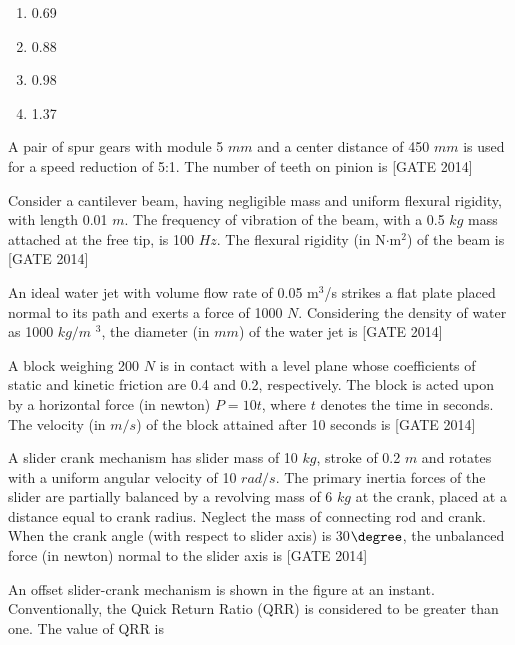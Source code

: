     \begin{multicols}{4}
    \begin{enumerate}
         \item 0.69
        \item 0.88
        \item 0.98
        \item 1.37
    
    \end{enumerate}
       
    \end{multicols}

    \item A pair of spur gears with module 5 $mm$ and a center distance of 450 $mm$ is used for a speed reduction of 5:1. The number of teeth on pinion is \underline{\hspace{2cm}} \hfill{[GATE 2014]}\\

   
    \item Consider a cantilever beam, having negligible mass and uniform flexural rigidity, with length 0.01 $m$. The frequency of vibration of the beam, with a 0.5 $kg$ mass attached at the free tip, is 100 $Hz$. The flexural rigidity (in N$\cdot$m$^2$) of the beam is \underline{\hspace{2cm}} \hfill{[GATE 2014]}\\

    \item An ideal water jet with volume flow rate of 0.05 m$^3$/s strikes a flat plate placed normal to its path and exerts a force of 1000 $N$. Considering the density of water as 1000 $kg/m$ $^3$, the diameter (in $mm$) of the water jet is \underline{\hspace{2cm}} \hfill{[GATE 2014]}\\
 

    \item A block weighing 200 $N$ is in contact with a level plane whose coefficients of static and kinetic friction are 0.4 and 0.2, respectively. The block is acted upon by a horizontal force (in newton) $P = 10t$, where $t$ denotes the time in seconds. The velocity (in $m/s$) of the block attained after 10 seconds is \underline{\hspace{2cm}} \hfill{[GATE 2014]}\\

      \item A slider crank mechanism has slider mass of 10 $kg$, stroke of 0.2 $m$ and rotates with a uniform angular velocity of 10 $rad/s$. The primary inertia forces of the slider are partially balanced by a revolving mass of 6 $kg$ at the crank, placed at a distance equal to crank radius. Neglect the mass of connecting rod and crank. When the crank angle (with respect to slider axis) is 30$\degree$, the unbalanced force (in newton) normal to the slider axis is\underline{\hspace{2cm}} \hfill{[GATE 2014]}
\\
 \item An offset slider-crank mechanism is shown in the figure at an instant. Conventionally, the Quick  Return Ratio (QRR) is considered to be greater than one. The value of QRR is 

